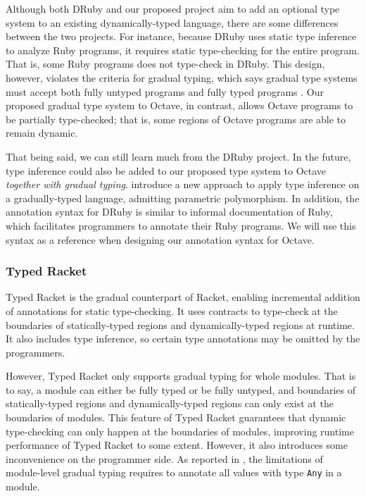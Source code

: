Although both DRuby and our proposed project aim to add an optional type system to an existing dynamically-typed language, there are some differences between the two projects. For instance, because DRuby uses static type inference to analyze Ruby programs, it requires static type-checking for the entire program. That is, some Ruby programs does not type-check in DRuby. This design, however, violates the criteria for gradual typing, which says gradual type systems must accept both fully untyped programs and fully typed programs \cite{siek2015refined}.  Our proposed gradual type system to Octave, in contrast, allows Octave programs to be partially type-checked; that is, some regions of Octave programs are able to remain dynamic.

That being said, we can still learn much from the DRuby project. In the future, type inference could also be added to our proposed type system to Octave \emph{together with gradual typing}. \citet{garcia2015principal} introduce a new approach to apply type inference on a gradually-typed language, admitting parametric polymorphism. In addition, the annotation syntax for DRuby is similar to informal documentation of Ruby, which facilitates programmers to annotate their Ruby programs. We will use this syntax as a reference when designing our annotation syntax for Octave.

\subsubsection{Typed Racket}
Typed Racket \cite{tobin2006interlanguage} is the gradual counterpart of Racket, enabling incremental addition of annotations for static type-checking. It uses contracts to type-check at the boundaries of statically-typed regions and dynamically-typed regions at runtime. It also includes type inference, so certain type annotations may be omitted by the programmers.

However, Typed Racket only supports gradual typing for whole modules. That is to say, a module can either be fully typed or be fully untyped, and boundaries of statically-typed regions and dynamically-typed regions can only exist at the boundaries of modules. This feature of Typed Racket guarantees that dynamic type-checking can only happen at the boundaries of modules, improving runtime performance of Typed Racket to some extent. However, it also introduces some inconvenience on the programmer side. As reported in \cite{figueroa2012practical}, the limitations of module-level gradual typing requires to annotate all values with type {\tt Any} in a module.

